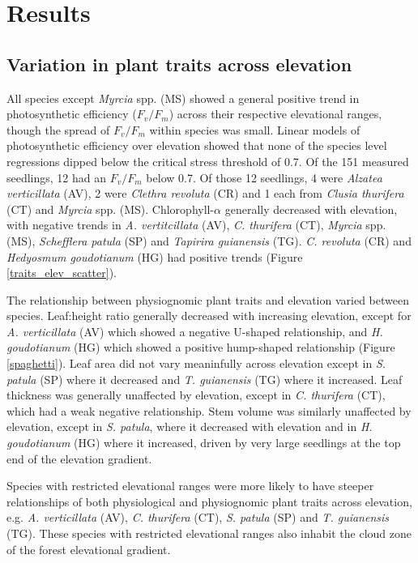 \documentclass[a4paper, 11pt]{article}
\begin{document}
\section{Results}

\subsection{Variation in plant traits across elevation}

All species except \textit{Myrcia} spp. (MS) showed a general positive trend in photosynthetic efficiency ($F_v/F_m$) across their respective elevational ranges, though the spread of $F_v/F_m$ within species was small. Linear models of photosynthetic efficiency over elevation showed that none of the species level regressions dipped below the critical stress threshold of 0.7. Of the 151 measured seedlings, 12 had an $F_v/F_m$ below 0.7. Of those 12 seedlings, 4 were \textit{Alzatea verticillata} (AV), 2 were  \textit{Clethra revoluta} (CR) and 1 each from \textit{Clusia thurifera} (CT) and \textit{Myrcia} spp. (MS). Chlorophyll-$\alpha$ generally decreased with elevation, with negative trends in \textit{A. vertitcillata} (AV), \textit{C. thurifera} (CT), \textit{Myrcia} spp. (MS), \textit{Schefflera patula} (SP) and \textit{Tapirira guianensis} (TG). \textit{C. revoluta} (CR)  and \textit{Hedyosmum goudotianum} (HG) had positive trends (Figure \ref{traits_elev_scatter}). 

The relationship between physiognomic plant traits and elevation varied between species. Leaf:height ratio generally decreased with increasing elevation, except for \textit{A. verticillata} (AV) which showed a negative U-shaped relationship, and \textit{H. goudotianum} (HG) which showed a positive hump-shaped relationship (Figure \ref{spaghetti}). Leaf area did not vary meaninfully across elevation except in \textit{S. patula} (SP) where it decreased and \textit{T. guianensis} (TG) where it increased. Leaf thickness was generally unaffected by elevation, except in \textit{C. thurifera} (CT), which had a weak negative relationship. Stem volume was similarly unaffected by elevation, except in \textit{S. patula}, where it decreased with elevation and in \textit{H. goudotianum} (HG) where it increased, driven by very large seedlings at the top end of the elevation gradient. 

Species with restricted elevational ranges were more likely to have steeper relationships of both physiological and physiognomic plant traits across elevation, e.g. \textit{A. verticillata} (AV), \textit{C. thurifera} (CT), \textit{S. patula} (SP) and \textit{T. guianensis} (TG). These species with restricted elevational ranges also inhabit the cloud zone of the forest elevational gradient. 
\end{document}
